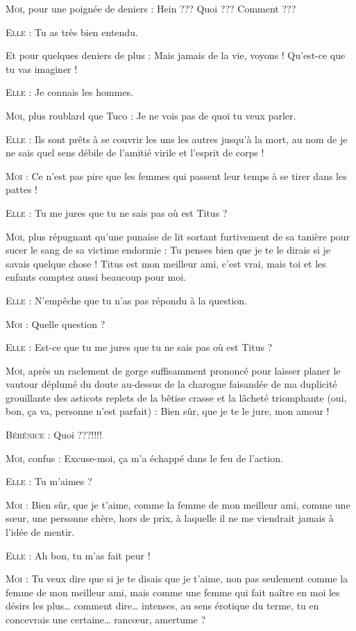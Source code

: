 \begin{dialogue}
\textsc{Moi}, pour une poignée de deniers : Hein ??? Quoi ??? Comment ???

\textsc{Elle} : Tu as très bien entendu.

Et pour quelques deniers de plus : Mais jamais de la vie, voyons ! Qu’est-ce que tu vas imaginer !

\textsc{Elle} : Je connais les hommes.

\textsc{Moi}, plus roublard que Tuco : Je ne vois pas de quoi tu veux parler.

\textsc{Elle} : Ils sont prêts à se couvrir les uns les autres jusqu’à la mort, au nom de je ne sais quel sens débile de l’amitié virile et l’esprit de corps !

\textsc{Moi} : Ce n’est pas pire que les femmes qui passent leur temps à se tirer dans les pattes !

\textsc{Elle} : Tu me jures que tu ne sais pas où est Titus ?

\textsc{Moi}, plus répugnant qu’une punaise de lit sortant furtivement de sa tanière pour sucer le sang de sa victime endormie : Tu penses bien que je te le dirais si je savais quelque chose ! Titus est mon meilleur ami, c’est vrai, mais toi et les enfants comptez aussi beaucoup pour moi.

\textsc{Elle} : N’empêche que tu n’as pas répondu à la question.

\textsc{Moi} : Quelle question ?

\textsc{Elle} : Est-ce que tu me jures que tu ne sais pas où est Titus ?

\textsc{Moi}, après un raclement de gorge suffisamment prononcé pour laisser planer le vautour déplumé du doute au-dessus de la charogne faisandée de ma duplicité grouillante des asticots replets de la bêtise crasse et la lâcheté triomphante (oui, bon, ça va, personne n’est parfait) : Bien sûr, que je te le jure, mon amour !

\textsc{Bérénice} : Quoi ???!!!!

\textsc{Moi}, confus : Excuse-moi, ça m’a échappé dans le feu de l’action.

\textsc{Elle} : Tu m’aimes ?

\textsc{Moi} : Bien sûr, que je t’aime, comme la femme de mon meilleur ami, comme une sœur, une personne chère, hors de prix, à laquelle il ne me viendrait jamais à l’idée de mentir.

\textsc{Elle} : Ah bon, tu m’as fait peur !

\textsc{Moi} : Tu veux dire que si je te disais que je t’aime, non pas seulement comme la femme de mon meilleur ami, mais comme une femme qui fait naître en moi les désirs les plus… comment dire… intenses, au sens érotique du terme, tu en concevrais une certaine… rancœur, amertume ?


\end{dialogue}

